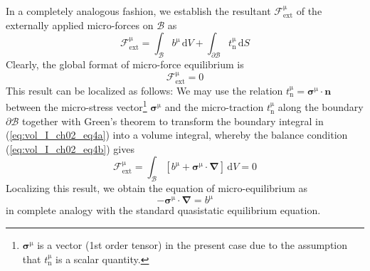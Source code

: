 In a completely analogous fashion, we establish the resultant ${\mathcal F}_{\mathrm{ext}}^{\mathrm{\mu}}$ of the externally
applied micro-forces on $\mathcal{B}$ as
\begin{equation}
  {\mathcal F}_{\mathrm{ext}}^{\mathrm{\mu}} = \int_{\mathcal{B}} b^{\mathrm{\mu}} \,{\mathrm{d}}V + \int_{\partial \mathcal{B}} t_{\mathrm{n}}^{\mathrm{\mu}} \,{\mathrm{d}}S
    \label{eq:vol_I_ch02_eq4a}
\end{equation}
Clearly, the global format of micro-force equilibrium is
\begin{equation}
  {\mathcal F}_{\mathrm{ext}}^{\mathrm{\mu}} = 0
    \label{eq:vol_I_ch02_eq4b}
\end{equation}
This result can be localized as follows: We may use the relation $t_{\mathrm{n}}^{\mathrm{\mu}}=\bm{\sigma}^{\mathrm{\mu}} \cdot\bm{n}$
between the micro-stress vector\footnote{$\bm{\sigma}^{\mathrm{\mu}}$ is a vector (1st order tensor) in the present case due to the assumption that $t_{\mathrm{n}}^{\mathrm{\mu}}$ is a scalar quantity.} $\bm{\sigma}^{\mathrm{\mu}}$ and the micro-traction $t_{\mathrm{n}}^{\mathrm{\mu}}$ along the boundary $\partial \mathcal{B}$ together with
Green's theorem to transform the boundary integral in
(\ref{eq:vol_I_ch02_eq4a}) into a volume integral, whereby the balance condition (\ref{eq:vol_I_ch02_eq4b}) gives
\begin{equation}
  {\mathcal F}_{\mathrm{ext}}^{\mathrm{\mu}} =
  \int_{\mathcal{B}}[b^{\mathrm{\mu}}+\bm{\sigma}^{\mathrm{\mu}}\cdot{\bm\nabla}]\,{\mathrm{d}}V = 0
     \label{eq:vol_I_ch02_eq6a}
\end{equation}
Localizing this result, we obtain the equation of micro-equilibrium as
\begin{equation}
   - \bm{\sigma}^{\mathrm{\mu}}\cdot{\bm\nabla} = b^{\mathrm{\mu}}
  \label{eq:vol_I_ch02_eq7a}
\end{equation}
in complete analogy with the standard quasistatic equilibrium equation.

